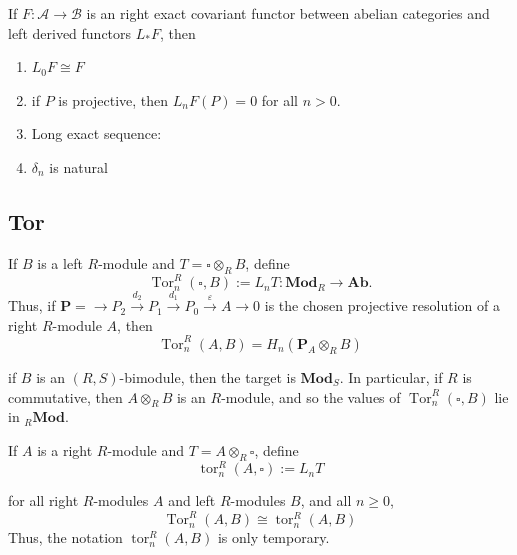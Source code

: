 \documentclass[12pt, oneside]{book}
\begin{document}
\begin{proposition}
    \label{pro: axiom}
    If $F:\mathcal{A} \rightarrow \mathcal{B}$ is an right exact    covariant functor between abelian categories and left derived functors $L_* F$, then
    \begin{enumerate}
        \item
              $L_0F \cong F$
        \item
              if $P$ is projective, then $L_n F\left(P\right)=0$ for all $n>0$.
        \item Long exact sequence:
        \item
              $\delta_n$ is natural
    \end{enumerate}
\end{proposition}


\subsection{Tor} %
\begin{definition}
    If $B$ is a left $R$-module and $T=\square \otimes_R B$, define
    \begin{equation*}
        \operatorname{Tor}_n^R(\square, B)
        :=
        L_n T : \mathbf{Mod}_R \rightarrow \mathbf{A b} .
    \end{equation*}
    Thus, if $\mathbf{P}=\rightarrow P_2 \xrightarrow{d_2} P_1 \xrightarrow{d_1} P_0 \xrightarrow{\varepsilon} A \rightarrow 0$ is the chosen projective resolution of a right $R$-module $A$, then
    \begin{equation*}
        \operatorname{Tor}_n^R(A, B)
        =
        H_n\left(\mathbf{P}_A \otimes_R B\right)
    \end{equation*}
    \begin{remark}
        if $B$ is an $\left(R, S\right)$-bimodule, then the target is $\mathbf{M o d}_S$.
        In particular, if $R$ is commutative, then $A \otimes_R B$ is an $R$-module, and so the values of $\operatorname{Tor}_n^R(\square, B)$ lie in ${ }_R \mathbf{Mod}$.
    \end{remark}
\end{definition}

\begin{definition}
    If $A$ is a right $R$-module and $T=A \otimes_R \square$, define
    \begin{equation*}
        \operatorname{tor}_n^R(A, \square):=L_n T
    \end{equation*}
    \begin{remark}
        for all right $R$-modules $A$ and left $R$-modules $B$, and all $n \geq 0$,
        \begin{equation*}
            \operatorname{Tor}_n^R(A, B) \cong \operatorname{tor}_n^R(A, B)
        \end{equation*}
        Thus, the notation $\operatorname{tor}_n^R(A, B)$ is only temporary.
    \end{remark}
\end{definition}
\end{document}
